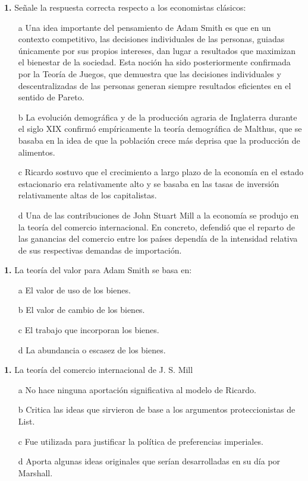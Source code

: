 \documentclass{nuevotema}
\begin{document}
\textbf{1.} Señale la respuesta correcta respecto a los economistas clásicos:
\begin{itemize}
	\item[a] Una idea importante del pensamiento de Adam Smith es que en un contexto competitivo, las decisiones individuales de las personas, guiadas únicamente por sus propios intereses, dan lugar a resultados que maximizan el bienestar de la sociedad. Esta noción ha sido posteriormente confirmada por la Teoría de Juegos, que demuestra que las decisiones individuales y descentralizadas de las personas generan siempre resultados eficientes en el sentido de Pareto.
	\item[b] La evolución demográfica y de la producción agraria de Inglaterra durante el siglo XIX confirmó empíricamente la teoría demográfica de Malthus, que se basaba en la idea de que la población crece más deprisa que la producción de alimentos.
	\item[c] Ricardo sostuvo que el crecimiento a largo plazo de la economía en el estado estacionario era relativamente alto y se basaba en las tasas de inversión relativamente altas de los capitalistas.
	\item[d] Una de las contribuciones de John Stuart Mill a la economía se produjo en la teoría del comercio internacional. En concreto, defendió que el reparto de las ganancias del comercio entre los países dependía de la intensidad relativa de sus respectivas demandas de importación.
\end{itemize}

\textbf{1.} La teoría del valor para Adam Smith se basa en:
\begin{itemize}
	\item[a] El valor de uso de los bienes.
	\item[b] El valor de cambio de los bienes.
	\item[c] El trabajo que incorporan los bienes.
	\item[d] La abundancia o escasez de los bienes.
\end{itemize}

\textbf{1.} La teoría del comercio internacional de J. S. Mill
\begin{itemize}
	\item[a] No hace ninguna aportación significativa al modelo de Ricardo.
	\item[b] Critica las ideas que sirvieron de base a los argumentos proteccionistas de List.
	\item[c] Fue utilizada para justificar la política de preferencias imperiales.
	\item[d] Aporta algunas ideas originales que serían desarrolladas en su día por Marshall.
\end{itemize}
\end{document}
